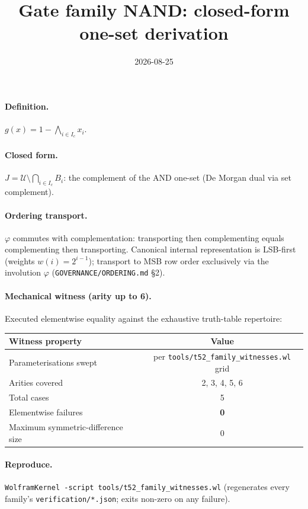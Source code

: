 \documentclass{article}
\title{Gate family NAND: closed-form one-set derivation}
\date{2026-08-25}
\begin{document}
\maketitle

\paragraph{Definition.} $g(x)=1-\bigwedge_{i\in I_c}x_i$.

\paragraph{Closed form.} $J=\mathcal{U}\setminus\bigcap_{i\in I_c}B_i$: the complement of the AND one-set (De Morgan dual via set complement).

\paragraph{Ordering transport.} $\varphi$ commutes with complementation: transporting then complementing equals complementing then transporting.
Canonical internal representation is LSB-first (weights $w(i)=2^{i-1}$);
transport to MSB row order exclusively via the involution $\varphi$
(\texttt{GOVERNANCE/ORDERING.md} \S2).

\paragraph{Mechanical witness (arity up to 6).} Executed elementwise equality
against the exhaustive truth-table repertoire:
\begin{center}
\begin{tabular}{lc}
\hline
Witness property & Value \\ \hline
Parameterisations swept & per \texttt{tools/t52_family_witnesses.wl} grid \\
Arities covered & 2, 3, 4, 5, 6 \\
Total cases & 5 \\
Elementwise failures & \textbf{0} \\
Maximum symmetric-difference size & 0 \\ \hline
\end{tabular}
\end{center}

\paragraph{Reproduce.} \texttt{WolframKernel -script tools/t52_family_witnesses.wl}
(regenerates every family's \texttt{verification/*.json}; exits non-zero on any failure).
\end{document}
